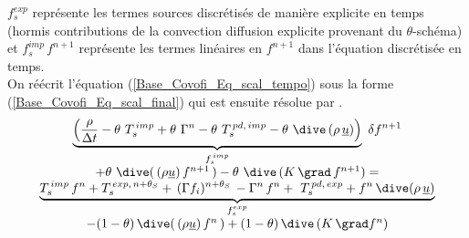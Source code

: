 $f_s^{exp}$ représente les termes sources discrétisés de manière explicite
en temps (hormis contributions de la convection diffusion explicite provenant du
$\theta$-schéma) et $f_s^{imp}\,f^{n+1}$ représente les termes linéaires
en $f^{n+1}$ dans l'équation discrétisée en temps.\\
On réécrit l'équation (\ref{Base_Covofi_Eq_scal_tempo}) sous la forme (\ref{Base_Covofi_Eq_scal_final})
qui est ensuite résolue par .
\begin{equation}
\label{Base_Covofi_Eq_scal_final}
\begin{array}{c}
\displaystyle
\underbrace{\left(\frac {\rho}{\Delta t}- \theta\,\, T_s^{\,imp}+ \theta\,\,
\Gamma^{n} -\theta\,\, T_s^{\,pd,\,imp} - \theta\,\,
\dive\,(\rho\,\underline{u})\right)}_{\text {$f_s^{\,imp}$}}\ \delta f^{n+1}
\\
+\theta\,\, \dive(\,(\rho \underline{u})\,f^{n+1}\,)
-\theta\,\, \dive\,(K\,\grad \,f^{n+1}) = \\
\underbrace{T_s^{\,imp}\,f^n +  T_s^{\,exp,\,n+\theta_S}
+\,(\Gamma f_i)^{n+\theta_S}\, - \Gamma^{n}\,f^n +\ T_s^{\,pd,\,exp} +
 f^{n}\,\dive(\rho\,\underline{u})}_{\text{$f_s^{exp}$}}\\
-(1-\theta)\,\dive(\,(\rho \underline{u})\,f^{n}\,)
+(1-\theta)\,\dive\,(K\,\grad f^{n})
\end{array}
\end{equation}
\\

